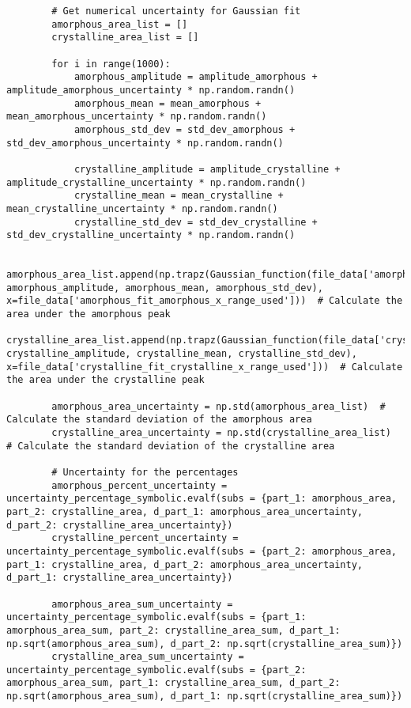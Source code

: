 \begin{small}
\begin{verbatim}
        # Get numerical uncertainty for Gaussian fit
        amorphous_area_list = []
        crystalline_area_list = []

        for i in range(1000):
            amorphous_amplitude = amplitude_amorphous + amplitude_amorphous_uncertainty * np.random.randn()
            amorphous_mean = mean_amorphous + mean_amorphous_uncertainty * np.random.randn()
            amorphous_std_dev = std_dev_amorphous + std_dev_amorphous_uncertainty * np.random.randn()

            crystalline_amplitude = amplitude_crystalline + amplitude_crystalline_uncertainty * np.random.randn()
            crystalline_mean = mean_crystalline + mean_crystalline_uncertainty * np.random.randn()
            crystalline_std_dev = std_dev_crystalline + std_dev_crystalline_uncertainty * np.random.randn()

            amorphous_area_list.append(np.trapz(Gaussian_function(file_data['amorphous_fit_amorphous_x_range_used'], amorphous_amplitude, amorphous_mean, amorphous_std_dev), x=file_data['amorphous_fit_amorphous_x_range_used']))  # Calculate the area under the amorphous peak
            crystalline_area_list.append(np.trapz(Gaussian_function(file_data['crystalline_fit_crystalline_x_range_used'], crystalline_amplitude, crystalline_mean, crystalline_std_dev), x=file_data['crystalline_fit_crystalline_x_range_used']))  # Calculate the area under the crystalline peak
        
        amorphous_area_uncertainty = np.std(amorphous_area_list)  # Calculate the standard deviation of the amorphous area
        crystalline_area_uncertainty = np.std(crystalline_area_list)  # Calculate the standard deviation of the crystalline area

        # Uncertainty for the percentages
        amorphous_percent_uncertainty = uncertainty_percentage_symbolic.evalf(subs = {part_1: amorphous_area, part_2: crystalline_area, d_part_1: amorphous_area_uncertainty, d_part_2: crystalline_area_uncertainty})
        crystalline_percent_uncertainty = uncertainty_percentage_symbolic.evalf(subs = {part_2: amorphous_area, part_1: crystalline_area, d_part_2: amorphous_area_uncertainty, d_part_1: crystalline_area_uncertainty})

        amorphous_area_sum_uncertainty = uncertainty_percentage_symbolic.evalf(subs = {part_1: amorphous_area_sum, part_2: crystalline_area_sum, d_part_1: np.sqrt(amorphous_area_sum), d_part_2: np.sqrt(crystalline_area_sum)})
        crystalline_area_sum_uncertainty = uncertainty_percentage_symbolic.evalf(subs = {part_2: amorphous_area_sum, part_1: crystalline_area_sum, d_part_2: np.sqrt(amorphous_area_sum), d_part_1: np.sqrt(crystalline_area_sum)})


\end{verbatim}
\end{small}
